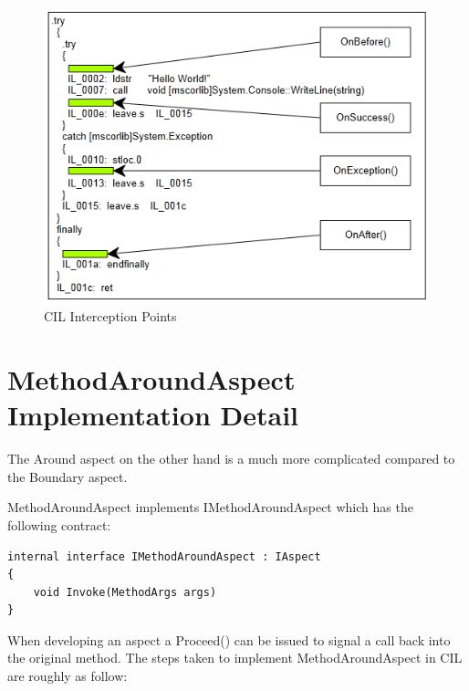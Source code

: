 \begin{figure}[H]
  \includegraphics[scale=1.0]{MethodBoundaryOverview.PNG}
  \centering
  \caption{CIL Interception Points\label{methodboundary02}}
\end{figure}

\section{MethodAroundAspect Implementation Detail}

The Around aspect on the other hand is a much more complicated compared to the Boundary aspect.

MethodAroundAspect implements IMethodAroundAspect which has the following contract:

\begin{lstlisting}[caption={IMethodAroundAspect Contract}, label=aroundcontract]
internal interface IMethodAroundAspect : IAspect
{
	void Invoke(MethodArgs args)
}
\end{lstlisting}

When developing an aspect a Proceed() can be issued to signal a call back into the original method. The steps taken to implement MethodAroundAspect in CIL are roughly as follow:

